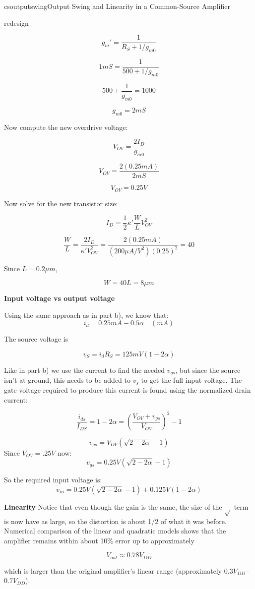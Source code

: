 \begin{mainquestion}{csoutputswing}{Output Swing and Linearity in a Common-Source Amplifier}
\begin{partquestion}{redesign}
\begin{answer}[2.5in]
\[
g_m'=\frac{1}{R_S+1/g_{m0}}
\]

\[
1mS = \frac{1}{500 + 1/g_{m0}}
\]

\[
500 + \frac{1}{g_{m0}} = 1000
\]

\[
g_{m0} = 2mS
\]

Now compute the new overdrive voltage:

\[
V_{OV}=\frac{2I_D}{g_{m0}}
\]

\[
V_{OV}=\frac{2(0.25mA)}{2mS}
\]

\[
V_{OV}=0.25V
\]

Now solve for the new transistor size:

\[
I_D=\frac12\kappa' \frac WL V_{OV}^2
\]

\[
\frac{W}{L}
=
\frac{2I_D}{\kappa'V_{OV}^2}
=
\frac{2(0.25mA)}
{(200\mu A/V^2)(0.25)^2}
=40
\]

Since \(L=0.2\mu m\),

\[
W = 40L = 8\mu m
\]

\textbf{Input voltage vs output voltage}

Using the same approach as in part b), we know that:
\[
i_d = 0.25mA -0.5\alpha  \quad (mA)
\]

The source voltage is

\[
v_S = i_d R_S= 125mV(1-2 \alpha)
\]

Like in part b) we use the current to find the needed \(v_{gs}\), but since the source isn't at ground, this needs to be added to \(v_s\) to get the full input voltage. The gate voltage required to produce this current is found using the normalized drain current:

\[\frac{i_{ds}}{I_{DS}}=1-2\alpha =\left(\frac{V_{OV}+v_{gs}}{V_{OV}}\right)^2
- 1\]

\[v_{gs}=V_{OV}\left(\sqrt{2-2\alpha }-1\right)\]
Since $V_{OV}=.25V$ now:
\[v_{gs}=0.25V\left(\sqrt{2-2\alpha }-1\right)\]

So the required input voltage is:
\[v_{in}=0.25V\left(\sqrt{2-2\alpha }-1\right)+ 0.125V (1-2 \alpha)\]

\textbf{Linearity}
Notice that even though the gain is the same, the size of the $\sqrt{}$ term is now have as large, so the distortion is about 1/2 of what it was before. 
Numerical comparison of the linear and quadratic models shows that the
amplifier remains within about 10\% error up to approximately

\[
V_{out} \approx 0.78V_{DD}
\]

which is larger than the original amplifier's linear range
(approximately \(0.3V_{DD}\)–\(0.7V_{DD}\)).


\end{answer}
\end{partquestion}
\end{mainquestion}
